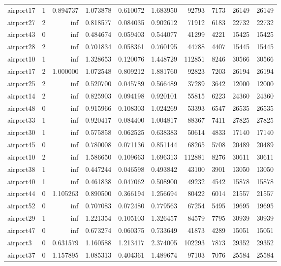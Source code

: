 \begin{longtable}{|l|r|r|r|r|r|r|r|r|r|}
airport17 & 1 & 0.894737 & 1.073878 & 0.610072 & 1.683950 & 92793 & 7173 & 26149 & 26149 \\
airport27 & 2 & inf & 0.818577 & 0.084035 & 0.902612 & 71912 & 6183 & 22732 & 22732 \\
airport43 & 0 & inf & 0.484674 & 0.059403 & 0.544077 & 41299 & 4221 & 15425 & 15425 \\
airport28 & 2 & inf & 0.701834 & 0.058361 & 0.760195 & 44788 & 4407 & 15445 & 15445 \\
airport10 & 1 & inf & 1.328653 & 0.120076 & 1.448729 & 112851 & 8246 & 30566 & 30566 \\
airport17 & 2 & 1.000000 & 1.072548 & 0.809212 & 1.881760 & 92823 & 7203 & 26194 & 26194 \\
airport25 & 2 & inf & 0.520700 & 0.045789 & 0.566489 & 37289 & 3642 & 12000 & 12000 \\
airport14 & 2 & inf & 0.825903 & 0.094198 & 0.920101 & 55815 & 6223 & 24360 & 24360 \\
airport48 & 0 & inf & 0.915966 & 0.108303 & 1.024269 & 53393 & 6547 & 26535 & 26535 \\
airport33 & 1 & inf & 0.920417 & 0.084400 & 1.004817 & 88367 & 7411 & 27825 & 27825 \\
airport30 & 1 & inf & 0.575858 & 0.062525 & 0.638383 & 50614 & 4833 & 17140 & 17140 \\
airport45 & 0 & inf & 0.780008 & 0.071136 & 0.851144 & 68265 & 5708 & 20489 & 20489 \\
airport10 & 2 & inf & 1.586650 & 0.109663 & 1.696313 & 112881 & 8276 & 30611 & 30611 \\
airport38 & 1 & inf & 0.447244 & 0.046598 & 0.493842 & 43100 & 3901 & 13050 & 13050 \\
airport40 & 1 & inf & 0.461838 & 0.047062 & 0.508900 & 49232 & 4542 & 15878 & 15878 \\
airport44 & 0 & 1.105263 & 0.890500 & 0.366194 & 1.256694 & 80422 & 6014 & 21557 & 21557 \\
airport52 & 0 & inf & 0.707083 & 0.072480 & 0.779563 & 67254 & 5495 & 19695 & 19695 \\
airport29 & 1 & inf & 1.221354 & 0.105103 & 1.326457 & 84579 & 7795 & 30939 & 30939 \\
airport47 & 0 & inf & 0.673274 & 0.060375 & 0.733649 & 41873 & 4289 & 15051 & 15051 \\
airport3 & 0 & 0.631579 & 1.160588 & 1.213417 & 2.374005 & 102293 & 7873 & 29352 & 29352 \\
airport37 & 0 & 1.157895 & 1.085313 & 0.404361 & 1.489674 & 97103 & 7076 & 25584 & 25584 \\

\end{longtable}
